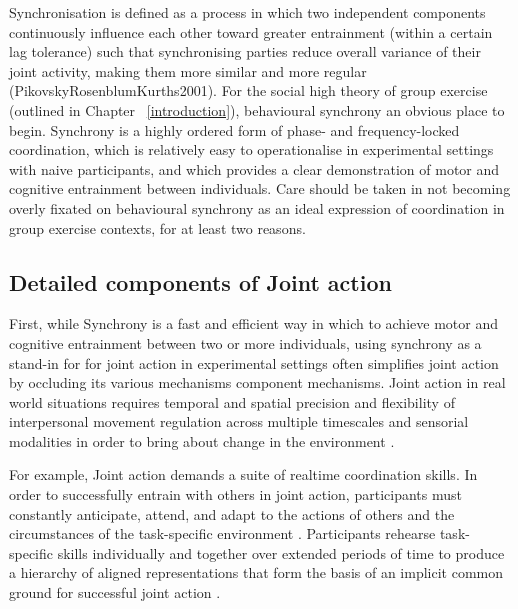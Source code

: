 \begin{CJK}{UTF8}{gbsn}
Synchronisation is defined as a process in which two independent components continuously influence each other toward greater entrainment (within a certain lag tolerance) such that synchronising parties reduce overall variance of their joint activity, making them more similar and more regular (PikovskyRosenblumKurths2001).   For the social high theory of group exercise (outlined in Chapter ~\ref{introduction}), behavioural synchrony an obvious place to begin.  Synchrony is a highly ordered form of phase- and frequency-locked coordination, which is relatively easy to operationalise in experimental settings with naive participants, and which provides a clear demonstration of motor and cognitive entrainment between individuals.  Care should be taken in not becoming overly fixated on behavioural synchrony as an ideal expression of coordination in group exercise contexts, for at least two reasons.

\subsection{Detailed components of Joint action}
First, while Synchrony is a fast and efficient way in which to achieve motor and cognitive entrainment between two or more individuals, using synchrony as a stand-in for for joint action in experimental settings often simplifies joint action by occluding its various mechanisms  component mechanisms.  Joint action in real world situations requires temporal and spatial precision and flexibility of interpersonal movement regulation across multiple timescales and sensorial modalities in order to bring about change in the environment \citep{Sebanz2006}.

For example, Joint action demands a suite of realtime coordination skills.  In order to successfully entrain with others in joint action, participants must constantly anticipate, attend, and adapt to the actions of others and the circumstances of the task-specific environment \citep{Keller2014}. Participants rehearse task-specific skills individually and together over extended periods of time to produce a hierarchy of aligned representations that form the basis of an implicit common ground for successful joint action \citep{Noy2017}.



\end{CJK}
